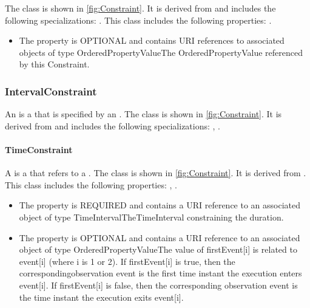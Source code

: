 %
The  class is shown in \ref{fig:Constraint}. It is derived from  and includes the following specializations: . %
This class includes the following properties: . %
\begin{itemize}%
\item%
The  property is OPTIONAL and contains URI references to associated objects of type OrderedPropertyValueThe OrderedPropertyValue referenced by this Constraint.%
\end{itemize}%
\subsubsection{IntervalConstraint}%
\label{sec:uml:IntervalConstraint}%
An  is a  that is specified by an .%
\newline%
\linebreak%
The  class is shown in \ref{fig:Constraint}. It is derived from  and includes the following specializations: , . %
%
\paragraph{TimeConstraint}%
\label{sec:uml:TimeConstraint}%
A  is a  that refers to a .%
\newline%
\linebreak%
The  class is shown in \ref{fig:Constraint}. It is derived from .%
This class includes the following properties: , . %
\begin{itemize}%
\item%
The  property is REQUIRED and contains a URI reference to an associated object of type TimeIntervalTheTimeInterval constraining the duration.%
\item%
The  property is OPTIONAL and contains a URI reference to an associated object of type OrderedPropertyValueThe value of firstEvent[i] is related to event[i] (where i is 1 or 2). If firstEvent[i] is true, then the correspondingobservation event is the first time instant the execution enters event[i]. If firstEvent[i] is false, then the corresponding observation event is the time instant the execution exits event[i].%
\end{itemize}%
